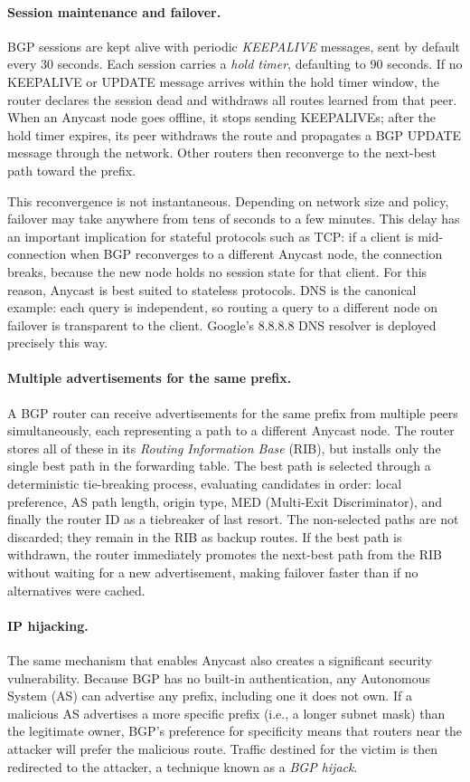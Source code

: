 \paragraph{Session maintenance and failover.}
BGP sessions are kept alive with periodic \textit{KEEPALIVE} messages, sent by default every 30 seconds. Each session carries a \textit{hold timer}, defaulting to 90 seconds. If no KEEPALIVE or UPDATE message arrives within the hold timer window, the router declares the session dead and withdraws all routes learned from that peer. When an Anycast node goes offline, it stops sending KEEPALIVEs; after the hold timer expires, its peer withdraws the route and propagates a BGP UPDATE message through the network. Other routers then reconverge to the next-best path toward the prefix.

This reconvergence is not instantaneous. Depending on network size and policy, failover may take anywhere from tens of seconds to a few minutes. This delay has an important implication for stateful protocols such as TCP: if a client is mid-connection when BGP reconverges to a different Anycast node, the connection breaks, because the new node holds no session state for that client. For this reason, Anycast is best suited to stateless protocols. DNS is the canonical example: each query is independent, so routing a query to a different node on failover is transparent to the client. Google's 8.8.8.8 DNS resolver is deployed precisely this way.

\paragraph{Multiple advertisements for the same prefix.}
A BGP router can receive advertisements for the same prefix from multiple peers simultaneously, each representing a path to a different Anycast node. The router stores all of these in its \textit{Routing Information Base} (RIB), but installs only the single best path in the forwarding table. The best path is selected through a deterministic tie-breaking process, evaluating candidates in order: local preference, AS path length, origin type, MED (Multi-Exit Discriminator), and finally the router ID as a tiebreaker of last resort. The non-selected paths are not discarded; they remain in the RIB as backup routes. If the best path is withdrawn, the router immediately promotes the next-best path from the RIB without waiting for a new advertisement, making failover faster than if no alternatives were cached.

\paragraph{IP hijacking.}
The same mechanism that enables Anycast also creates a significant security vulnerability. Because BGP has no built-in authentication, any Autonomous System (AS) can advertise any prefix, including one it does not own. If a malicious AS advertises a more specific prefix (i.e., a longer subnet mask) than the legitimate owner, BGP's preference for specificity means that routers near the attacker will prefer the malicious route. Traffic destined for the victim is then redirected to the attacker, a technique known as a \emph{BGP hijack}.

